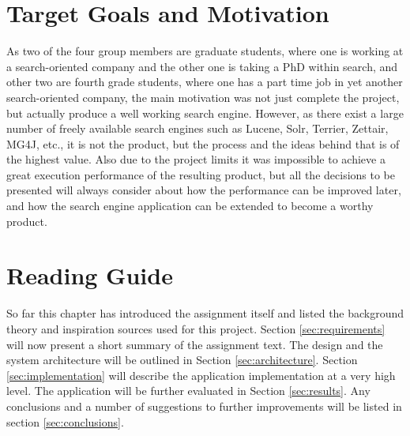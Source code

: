 \section{Target Goals and Motivation}
As two of the four group members are graduate students, where one is working at a search-oriented company and the other one is taking a PhD within search, and other two are fourth grade students, where one has a part time job in yet another search-oriented company, the main motivation was not just complete the project, but actually produce a well working search engine. However, as there exist a large number of freely available search engines such as Lucene, Solr, Terrier, Zettair, MG4J, etc., it is not the product, but the process and the ideas behind that is of the highest value. Also due to the project limits it was impossible to achieve a great execution performance of the resulting product, but all the decisions to be presented will always consider about how the performance can be improved later, and how the search engine application can be extended to become a worthy product.

\section{Reading Guide}
So far this chapter has introduced the assignment itself and listed the background theory and inspiration sources used for this project. Section \ref{sec:requirements} will now present a short summary of the assignment text. The design and the system architecture will be outlined in Section \ref{sec:architecture}. Section \ref{sec:implementation} will describe the application implementation at a very high level. The application will be further evaluated in Section \ref{sec:results}. Any conclusions and a number of suggestions to further improvements will be listed in section \ref{sec:conclusions}.